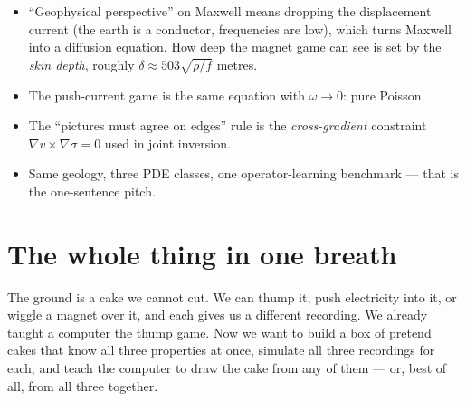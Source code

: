 \documentclass[11pt,a4paper]{article}
\begin{document}
\begin{itemize}[leftmargin=2em]
  \item ``Geophysical perspective'' on Maxwell means dropping the displacement current
        (the earth is a conductor, frequencies are low), which turns Maxwell into a
        diffusion equation. How deep the magnet game can see is set by the
        \emph{skin depth}, roughly $\delta \approx 503\sqrt{\rho/f}$ metres.
  \item The push-current game is the same equation with $\omega \to 0$: pure Poisson.
  \item The ``pictures must agree on edges'' rule is the \emph{cross-gradient} constraint
        $\nabla v \times \nabla \sigma = 0$ used in joint inversion.
  \item Same geology, three PDE classes, one operator-learning benchmark --- that is the
        one-sentence pitch.
\end{itemize}

\section*{The whole thing in one breath}

The ground is a cake we cannot cut. We can thump it, push electricity into it, or
wiggle a magnet over it, and each gives us a different recording. We already taught a
computer the thump game. Now we want to build a box of pretend cakes that know all
three properties at once, simulate all three recordings for each, and teach the
computer to draw the cake from any of them --- or, best of all, from all three together.
\end{document}
